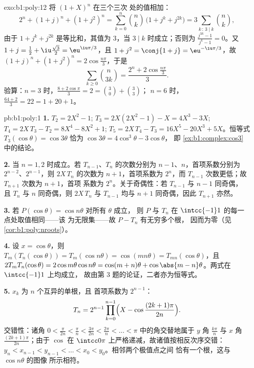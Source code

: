 \begin{solution}{exo:b1:poly:12}
将 $(1 + X)^n$ 在三个三次
处的值相加：
\[
2^n + (1 + j)^n + (1 + j^2)^n
= \sum_{k=0}^n \binom nk\,\bigl(1 + j^k + j^{2k}\bigr)
= 3\sum_{k\,:\,3\mid k}\binom nk ,
\]
由于 $1 + j^k + j^{2k}$ 是等比和，其值为 $3$，当 $3
\mid k$ 时成立；否则为 $\frac{j^{3k} - 1}{j^k - 1} = 0$。又 $1 +
j = \frac12 + \iu\frac{\sqrt3}2 = \eu^{\iu\pi/3}$，且 $1 + j^2 =
\conj{1 + j} = \eu^{-\iu\pi/3}$，故 $(1+j)^n + (1+j^2)^n =
2\cos\frac{n\pi}3$，于是
\[
\sum_{k\geq0}\binom n{3k} = \frac{2^n + 2\cos\frac{n\pi}3}{3} .
\]
验算：$n = 3$ 时，$\frac{8 + 2\cos\pi}3 = 2 = \binom30 + \binom33$；
$n = 6$ 时，$\frac{64 + 2}3 = 22 = 1 + 20 + 1$。
\end{solution}

\begin{solution}{pb:b1:poly:1}
\textbf{1.} $T_2 = 2X^2 - 1$; $T_3 = 2X(2X^2 - 1) - X = 4X^3 -
3X$; $T_4 = 2X\,T_3 - T_2 = 8X^4 - 8X^2 + 1$; $T_5 = 2X\,T_4 - T_3
= 16X^5 - 20X^3 + 5X$。恒等式 $T_3(\cos\theta) = \cos3\theta$
恰为 $\cos3\theta = 4\cos^3\theta - 3\cos\theta$，
即 \cref{ex:b1:complex:cos3} 中的结论。

\textbf{2.} 当 $n = 1, 2$ 时成立。若 $T_{n-1}$、$T_n$ 的次数分别为
$n-1$、$n$，首项系数分别为 $2^{n-2}$、$2^{n-1}$，则
$2X\,T_n$ 的次数为 $n+1$，首项系数为 $2^n$，而
$T_{n-1}$ 次数更低；故 $T_{n+1}$ 次数为 $n + 1$，首项
系数为 $2^n$。关于奇偶性：若 $T_{n-1}$ 与 $n - 1$ 同奇偶，
且 $T_n$ 与 $n$ 同奇偶，则 $2X\,T_n$ 与 $T_{n-1}$ 均与
$n + 1$ 同奇偶，因此 $T_{n+1}$ 亦然。

\textbf{3.} 若 $P(\cos\theta) = \cos n\theta$ 对所有 $\theta$ 成立，
则 $P$ 与 $T_n$ 在 $\intcc{-1}1$ 的每一点处取值相同——该
为无限集——故 $P - T_n$ 有无穷多个根，
因而为零（见\cref{cor:b1:poly:nroots}）。

\textbf{4.} 设 $x = \cos\theta$，则 $T_m(T_n(\cos\theta)) =
T_m(\cos n\theta) = \cos(mn\theta) = T_{mn}(\cos\theta)$，且
$2T_mT_n(\cos\theta) = 2\cos m\theta\cos n\theta = \cos(m+n)\theta
+ \cos\abs{m - n}\theta$。两式在 $\intcc{-1}1$ 上均成立，
故由第 3 题的论证，二者亦为恒等式。

\textbf{5.} $x_k$ 为 $n$ 个互异的单根，且
首项系数为 $2^{n-1}$：
\[
T_n = 2^{n-1}\prod_{k=0}^{n-1}
\Bigl(X - \cos\frac{(2k+1)\pi}{2n}\Bigr) .
\]
交错性：诸角 $0 < \frac{\pi}{2n} < \frac\pi n <
\frac{3\pi}{2n} < \frac{2\pi}n < \dots < \pi$ 中的角交替地属于
$y$ 角 $\frac{k\pi}n$ 与 $x$ 角
$\frac{(2k+1)\pi}{2n}$；由于 $\cos$ 在
$\intcc0\pi$ 上严格递减，故诸值按相反次序交错：$y_n <
x_{n-1} < y_{n-1} < \dots < x_0 < y_0$。相邻两个极值点之间
恰有一个根，这与 $\cos n\theta$ 的图像
所示相符。


\end{solution}
